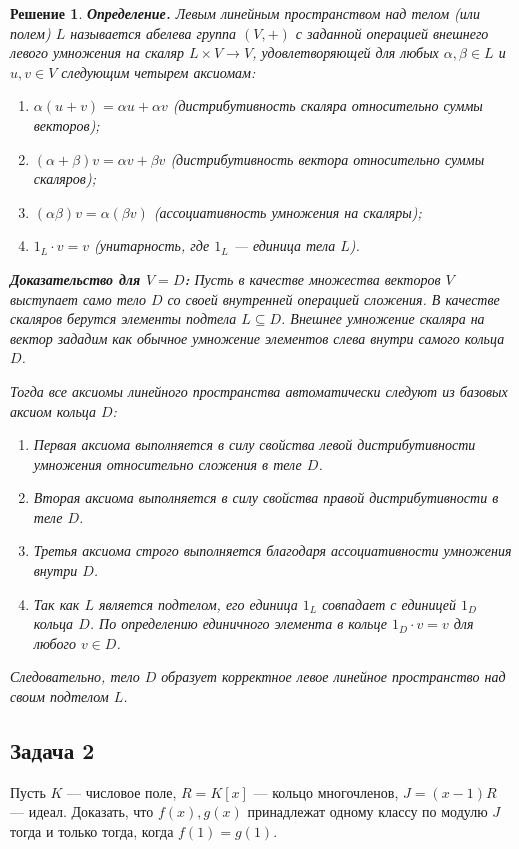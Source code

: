 \documentclass[14pt]{article}
\newtheorem*{solution}{Решение}
\begin{document}
	\begin{solution}
		\textbf{Определение.} Левым линейным пространством над телом (или полем) $L$ называется абелева группа $(V,+)$ с заданной операцией внешнего левого умножения на скаляр $L \times V \to V$, удовлетворяющей для любых $\alpha,\beta \in L$ и $u,v \in V$ следующим четырем аксиомам:
		\begin{enumerate}[label=(\arabic*)]
			\item $\alpha(u+v) = \alpha u + \alpha v$ (дистрибутивность скаляра относительно суммы векторов);
			\item $(\alpha+\beta)v = \alpha v + \beta v$ (дистрибутивность вектора относительно суммы скаляров);
			\item $(\alpha\beta)v = \alpha(\beta v)$ (ассоциативность умножения на скаляры);
			\item $1_L \cdot v = v$ (унитарность, где $1_L$ — единица тела $L$).
		\end{enumerate}
		
		\textbf{Доказательство для $V=D$:} 
		Пусть в качестве множества векторов $V$ выступает само тело $D$ со своей внутренней операцией сложения. В качестве скаляров берутся элементы подтела $L \subseteq D$. Внешнее умножение скаляра на вектор зададим как обычное умножение элементов слева внутри самого кольца $D$.
		
		Тогда все аксиомы линейного пространства автоматически следуют из базовых аксиом кольца $D$:
		\begin{enumerate}[label=(\arabic*)]
			\item Первая аксиома выполняется в силу свойства левой дистрибутивности умножения относительно сложения в теле $D$.
			\item Вторая аксиома выполняется в силу свойства правой дистрибутивности в теле $D$.
			\item Третья аксиома строго выполняется благодаря ассоциативности умножения внутри $D$.
			\item Так как $L$ является подтелом, его единица $1_L$ совпадает с единицей $1_D$ кольца $D$. По определению единичного элемента в кольце $1_D \cdot v = v$ для любого $v \in D$.
		\end{enumerate}
		Следовательно, тело $D$ образует корректное левое линейное пространство над своим подтелом $L$.
	\end{solution}
	
	\subsection*{Задача 2}
	Пусть $K$ — числовое поле, $R=K[x]$ — кольцо многочленов, $J=(x-1)R$ — идеал. Доказать, что $f(x),g(x)$ принадлежат одному классу по модулю $J$ тогда и только тогда, когда $f(1)=g(1)$.
	
\end{document}
